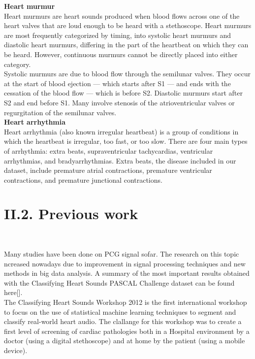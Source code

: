 \documentclass[11pt]{report}
\theoremstyle{plain}
\theoremstyle{definition}
\theoremstyle{definition}
\theoremstyle{proposition}
\begin{document}
\textbf{Heart murmur}
\\

Heart murmurs are heart sounds produced when blood flows across one of the heart valves that are loud enough to be heard with a stethoscope. Heart murmurs are most frequently categorized by timing, into systolic heart murmurs and diastolic heart murmurs, differing in the part of the heartbeat on which they can be heard. However, continuous murmurs cannot be directly placed into either category.
\\

Systolic murmurs are due to blood flow through the semilunar valves. They occur at the start of blood ejection — which starts after S1 — and ends with the cessation of the blood flow — which is before S2. Diastolic murmurs start after S2 and end before S1. Many involve stenosis of the atrioventricular valves or regurgitation of the semilunar valves.
\\

\textbf{Heart arrhythmia}
\\

Heart arrhythmia (also known irregular heartbeat) is a group of conditions in which the heartbeat is irregular, too fast, or too slow. There are four main types of arrhythmia: extra beats, supraventricular tachycardias, ventricular arrhythmias, and bradyarrhythmias. Extra beats, the disease included in our dataset, include premature atrial contractions, premature ventricular contractions, and premature junctional contractions.


\section*{II.2. Previous work}
\

Many studies have been done on PCG signal sofar. The research on this topic ncreased nowadays due to improvement in signal processing techniques and new methods in big data analysis. A summary of the most important results obtained with the Classifying Heart Sounds PASCAL Challenge dataset can be found here[].
\\

The Classifying Heart Sounds Workshop 2012 is the first international workshop to focus on the use of statistical machine learning techniques to segment and classify real-world heart audio. The clallange for this workshop was to create a first level of screening of cardiac pathologies both in a Hospital environment by a doctor (using a digital stethoscope) and at home by the patient (using a mobile device). 
\\
\end{document}
